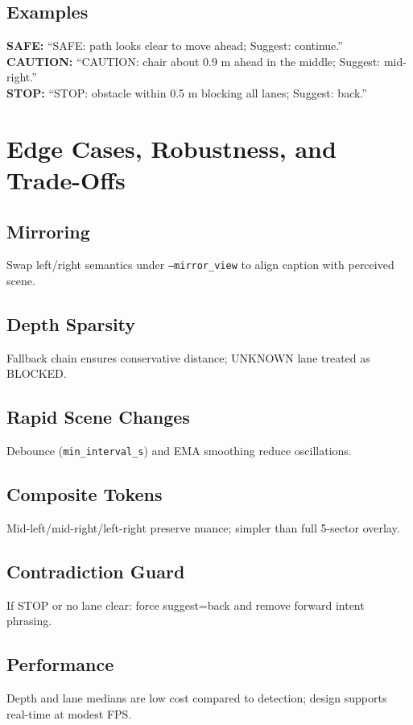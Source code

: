 \documentclass[11pt,a4paper]{article}
\newcommand{\code}[1]{\texttt{#1}}
\begin{document}
\subsection{Examples}
\textbf{SAFE:} ``SAFE: path looks clear to move ahead; Suggest: continue.''\\
\textbf{CAUTION:} ``CAUTION: chair about 0.9 m ahead in the middle; Suggest: mid-right.''\\
\textbf{STOP:} ``STOP: obstacle within 0.5 m blocking all lanes; Suggest: back.''

\section{Edge Cases, Robustness, and Trade-Offs}
\subsection{Mirroring}
Swap left/right semantics under \code{--mirror_view} to align caption with perceived scene.

\subsection{Depth Sparsity}
Fallback chain ensures conservative distance; UNKNOWN lane treated as BLOCKED.

\subsection{Rapid Scene Changes}
Debounce (\code{min_interval_s}) and EMA smoothing reduce oscillations.

\subsection{Composite Tokens}
Mid-left/mid-right/left-right preserve nuance; simpler than full 5-sector overlay.

\subsection{Contradiction Guard}
If STOP or no lane clear: force suggest=back and remove forward intent phrasing.

\subsection{Performance}
Depth and lane medians are low cost compared to detection; design supports real-time at modest FPS.
\end{document}
